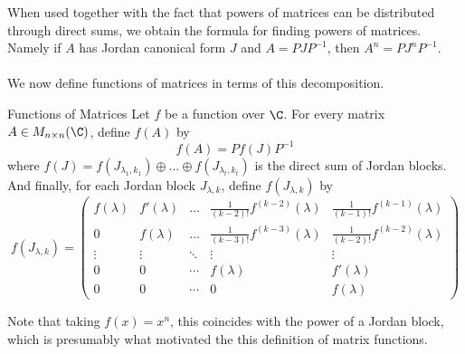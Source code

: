 When used together with the fact that powers of matrices can be distributed through direct sums, we obtain the formula for finding powers of matrices. Namely if $A$ has Jordan canonical form $J$ and $A=PJP^{-1}$, then $A^n=PJ^nP^{-1}$. \\~\\

We now define functions of matrices in terms of this decomposition. 

\begin{defn}{Functions of Matrices}{} Let $f$ be a function over $\C$. For every matrix $A\in M_{n\times n}(\C)$, define $f(A)$ by $$f(A)=Pf(J)P^{-1}$$ where $f(J)=f(J_{\lambda_1,k_1})\oplus\dots\oplus f(J_{\lambda_t,k_t})$ is the direct sum of Jordan blocks. And finally, for each Jordan block $J_{\lambda,k}$, define $f(J_{\lambda,k})$ by $$f(J_{\lambda,k})=\begin{pmatrix}
f(\lambda) & f'(\lambda) & \dots & \frac{1}{(k-2)!}f^{(k-2)}(\lambda) & \frac{1}{(k-1)!}f^{(k-1)}(\lambda)\\
0 & f(\lambda) & \dots & \frac{1}{(k-3)!}f^{(k-3)}(\lambda) & \frac{1}{(k-2)!}f^{(k-2)}(\lambda)\\
\vdots & \vdots & \ddots & \vdots & \vdots\\
0 & 0 & \cdots & f(\lambda) & f'(\lambda)\\
0 & 0 & \cdots & 0 & f(\lambda)
\end{pmatrix}$$
\end{defn}

Note that taking $f(x)=x^n$, this coincides with the power of a Jordan block, which is presumably what motivated the this definition of matrix functions. 